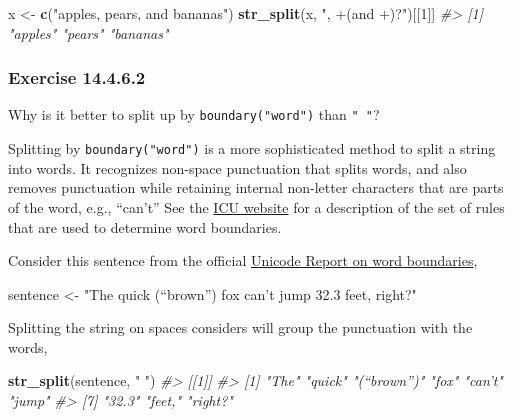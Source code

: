 \documentclass[]{book}
\newenvironment{Shaded}{\begin{snugshade}}{\end{snugshade}}
\newcommand{\CommentTok}[1]{\textcolor[rgb]{0.56,0.35,0.01}{\textit{#1}}}
\newcommand{\DecValTok}[1]{\textcolor[rgb]{0.00,0.00,0.81}{#1}}
\newcommand{\KeywordTok}[1]{\textcolor[rgb]{0.13,0.29,0.53}{\textbf{#1}}}
\newcommand{\NormalTok}[1]{#1}
\newcommand{\StringTok}[1]{\textcolor[rgb]{0.31,0.60,0.02}{#1}}
\theoremstyle{plain}
\theoremstyle{remark}
\begin{document}
\begin{Shaded}
\begin{Highlighting}[]
\NormalTok{x <-}\StringTok{ }\KeywordTok{c}\NormalTok{(}\StringTok{"apples, pears, and bananas"}\NormalTok{)}
\KeywordTok{str_split}\NormalTok{(x, }\StringTok{", +(and +)?"}\NormalTok{)[[}\DecValTok{1}\NormalTok{]]}
\CommentTok{#> [1] "apples"  "pears"   "bananas"}
\end{Highlighting}
\end{Shaded}

\hypertarget{exercise-14.4.6.2}{%
\subsubsection*{\texorpdfstring{Exercise {14.4.6.2}}{Exercise 14.4.6.2}}\label{exercise-14.4.6.2}}

Why is it better to split up by \texttt{boundary("word")} than \texttt{"\ "}?

Splitting by \texttt{boundary("word")} is a more sophisticated method to split a string into words.
It recognizes non-space punctuation that splits words, and also removes punctuation while retaining internal non-letter characters that are parts of the word, e.g., ``can't''
See the \href{http://userguide.icu-project.org/boundaryanalysis}{ICU website} for a description of the set of rules that are used to determine word boundaries.

Consider this sentence from the official \href{http://www.unicode.org/reports/tr29/\#Word_Boundaries}{Unicode Report on word boundaries},

\begin{Shaded}
\begin{Highlighting}[]
\NormalTok{sentence <-}\StringTok{ "The quick (“brown”) fox can’t jump 32.3 feet, right?"}
\end{Highlighting}
\end{Shaded}

Splitting the string on spaces considers will group the punctuation with the words,

\begin{Shaded}
\begin{Highlighting}[]
\KeywordTok{str_split}\NormalTok{(sentence, }\StringTok{" "}\NormalTok{)}
\CommentTok{#> [[1]]}
\CommentTok{#> [1] "The"       "quick"     "(“brown”)" "fox"       "can’t"     "jump"     }
\CommentTok{#> [7] "32.3"      "feet,"     "right?"}
\end{Highlighting}
\end{Shaded}
\end{document}
